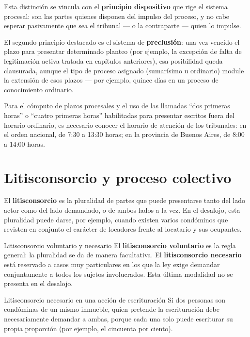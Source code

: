\documentclass[12pt,oneside]{book}
\begin{document}
Esta distinción se vincula con el \textbf{principio dispositivo} que rige el sistema procesal: son las partes quienes disponen del impulso del proceso, y no cabe esperar pasivamente que sea el tribunal --- o la contraparte --- quien lo impulse.

El segundo principio destacado es el sistema de \textbf{preclusión}: una vez vencido el plazo para presentar determinado planteo (por ejemplo, la excepción de falta de legitimación activa tratada en capítulos anteriores), esa posibilidad queda clausurada, aunque el tipo de proceso asignado (sumarísimo u ordinario) module la extensión de esos plazos --- por ejemplo, quince días en un proceso de conocimiento ordinario.

\begin{note}
Para el cómputo de plazos procesales y el uso de las llamadas ``dos primeras horas'' o ``cuatro primeras horas'' habilitadas para presentar escritos fuera del horario ordinario, es necesario conocer el horario de atención de los tribunales: en el orden nacional, de 7:30 a 13:30 horas; en la provincia de Buenos Aires, de 8:00 a 14:00 horas.
\end{note}

\section{Litisconsorcio y proceso colectivo}

El \textbf{litisconsorcio} es la pluralidad de partes que puede presentarse tanto del lado actor como del lado demandado, o de ambos lados a la vez. En el desalojo, esta pluralidad puede darse, por ejemplo, cuando existen varios condóminos que revisten en conjunto el carácter de locadores frente al locatario y sus ocupantes.

\begin{definition}{Litisconsorcio voluntario y necesario}
El \textbf{litisconsorcio voluntario} es la regla general: la pluralidad se da de manera facultativa. El \textbf{litisconsorcio necesario} está reservado a casos muy particulares en los que la ley exige demandar conjuntamente a todos los sujetos involucrados. Esta última modalidad no se presenta en el desalojo.
\end{definition}

\begin{example}{Litisconsorcio necesario en una acción de escrituración}
Si dos personas son condóminas de un mismo inmueble, quien pretende la escrituración debe necesariamente demandar a ambas, porque cada una solo puede escriturar su propia proporción (por ejemplo, el cincuenta por ciento).
\end{example}
\end{document}
